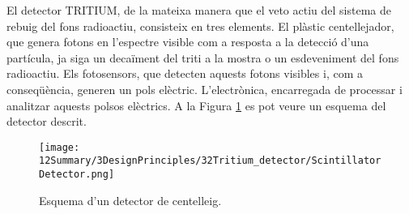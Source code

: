 El detector TRITIUM, de la mateixa manera que el veto actiu del sistema de rebuig del fons radioactiu, consisteix en tres elements. El plàstic centellejador, que genera fotons en l'espectre visible com a resposta a la detecció d'una partícula, ja siga un decaïment del triti a la mostra o un esdeveniment del fons radioactiu. Els fotosensors, que detecten aquests fotons visibles i, com a conseqüència, generen un pols elèctric. L'electrònica, encarregada de processar i analitzar aquests polsos elèctrics. A la Figura \ref{fig:EsquemaDetector} es pot veure un esquema del detector descrit.

\begin{figure}[hbtp]
\texttt{[image: 12Summary/3DesignPrinciples/32Tritium\_detector/ScintillatorDetector.png]}
\centering
\caption{Esquema d'un detector de centelleig.\label{fig:EsquemaDetector}}
\end{figure}